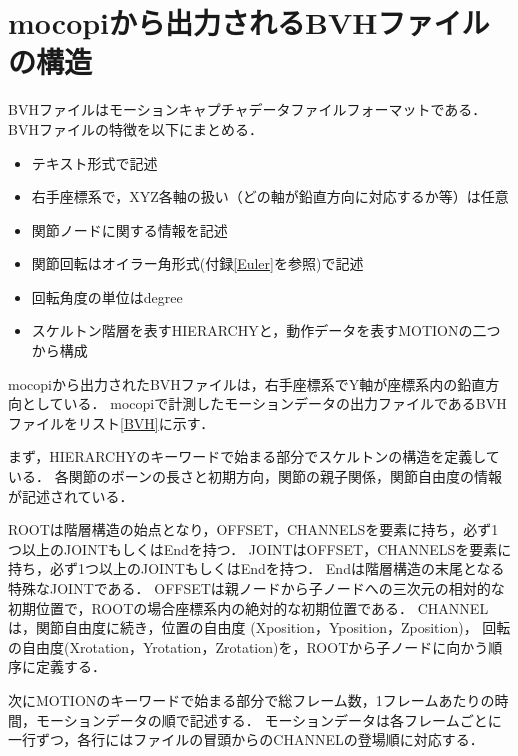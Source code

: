 \documentclass[a4j, fleqn, 12pt]{jsreport}
\begin{document}
\appendix
\chapter{mocopiから出力されるBVHファイルの構造}\label{BVH_file}
BVHファイルはモーションキャプチャデータファイルフォーマットである．
BVHファイルの特徴を以下にまとめる\cite{BVH}．
\begin{itemize}
  \item テキスト形式で記述
  \item 右手座標系で，XYZ各軸の扱い（どの軸が鉛直方向に対応するか等）は任意
  \item 関節ノードに関する情報を記述
  \item 関節回転はオイラー角形式(付録\ref{Euler}を参照)で記述
  \item 回転角度の単位はdegree
  \item スケルトン階層を表すHIERARCHYと，動作データを表すMOTIONの二つから構成
\end{itemize}
mocopiから出力されたBVHファイルは，右手座標系でY軸が座標系内の鉛直方向としている．
mocopiで計測したモーションデータの出力ファイルであるBVHファイルをリスト\ref{BVH}に示す．

まず，HIERARCHYのキーワードで始まる部分でスケルトンの構造を定義している．
各関節のボーンの長さと初期方向，関節の親子関係，関節自由度の情報が記述されている．

ROOTは階層構造の始点となり，OFFSET，CHANNELSを要素に持ち，必ず1つ以上のJOINTもしくはEndを持つ．
JOINTはOFFSET，CHANNELSを要素に持ち，必ず1つ以上のJOINTもしくはEndを持つ．
Endは階層構造の末尾となる特殊なJOINTである．
OFFSETは親ノードから子ノードへの三次元の相対的な初期位置で，ROOTの場合座標系内の絶対的な初期位置である．
CHANNELは，関節自由度に続き，位置の自由度 (Xposition，Yposition，Zposition)，
回転の自由度(Xrotation，Yrotation，Zrotation)を，ROOTから子ノードに向かう順序に定義する．

次にMOTIONのキーワードで始まる部分で総フレーム数，1フレームあたりの時間，モーションデータの順で記述する．
モーションデータは各フレームごとに一行ずつ，各行にはファイルの冒頭からのCHANNELの登場順に対応する．
\end{document}
